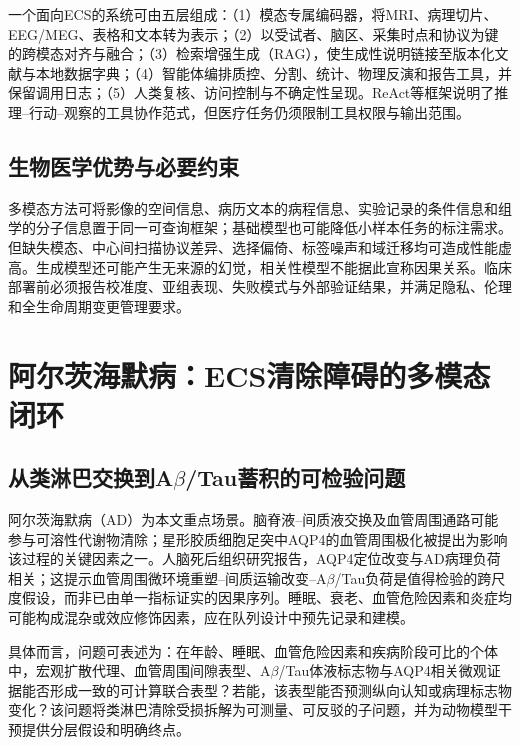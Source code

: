 ﻿\documentclass[11pt,a4paper]{article}
\begin{document}
一个面向ECS的系统可由五层组成：（1）模态专属编码器，将MRI、病理切片、EEG/MEG、表格和文本转为表示；（2）以受试者、脑区、采集时点和协议为键的跨模态对齐与融合；（3）检索增强生成（RAG），使生成性说明链接至版本化文献与本地数据字典\cite{lewis2020}；（4）智能体编排质控、分割、统计、物理反演和报告工具，并保留调用日志；（5）人类复核、访问控制与不确定性呈现。ReAct等框架说明了推理--行动--观察的工具协作范式\cite{yao2023}，但医疗任务仍须限制工具权限与输出范围。

\subsection{生物医学优势与必要约束}
多模态方法可将影像的空间信息、病历文本的病程信息、实验记录的条件信息和组学的分子信息置于同一可查询框架；基础模型也可能降低小样本任务的标注需求\cite{moor2023}。但缺失模态、中心间扫描协议差异、选择偏倚、标签噪声和域迁移均可造成性能虚高。生成模型还可能产生无来源的幻觉，相关性模型不能据此宣称因果关系。临床部署前必须报告校准度、亚组表现、失败模式与外部验证结果，并满足隐私、伦理和全生命周期变更管理要求\cite{topol2019,fdaaiml2021}。

\section{阿尔茨海默病：ECS清除障碍的多模态闭环}
\subsection{从类淋巴交换到A$\beta$/Tau蓄积的可检验问题}
阿尔茨海默病（AD）为本文重点场景。脑脊液--间质液交换及血管周围通路可能参与可溶性代谢物清除；星形胶质细胞足突中AQP4的血管周围极化被提出为影响该过程的关键因素之一\cite{iliff2012,zeppenfeld2017}。人脑死后组织研究报告，AQP4定位改变与AD病理负荷相关\cite{zeppenfeld2017}；这提示血管周围微环境重塑--间质运输改变--A$\beta$/Tau负荷是值得检验的跨尺度假设，而非已由单一指标证实的因果序列。睡眠、衰老、血管危险因素和炎症均可能构成混杂或效应修饰因素，应在队列设计中预先记录和建模\cite{xie2013,mestre2020}。

具体而言，问题可表述为：在年龄、睡眠、血管危险因素和疾病阶段可比的个体中，宏观扩散代理、血管周围间隙表型、A$\beta$/Tau体液标志物与AQP4相关微观证据能否形成一致的可计算联合表型？若能，该表型能否预测纵向认知或病理标志物变化？该问题将类淋巴清除受损拆解为可测量、可反驳的子问题，并为动物模型干预提供分层假设和明确终点。
\end{document}
